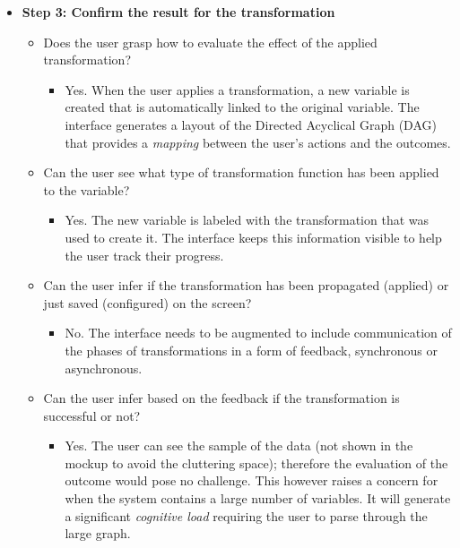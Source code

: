 \documentclass[12pt,letterpaper]{article}
\begin{document}
\begin{itemize}
\begin{itemize}
    \end{itemize}
    \item \textbf{Step 3: Confirm the result for the transformation}
    \begin{itemize}
        \item Does the user grasp how to evaluate the effect of the applied transformation?
        \begin{itemize}
                \item Yes. When the user applies a transformation, a new variable is created that is automatically linked to the original variable. The interface generates a layout of the Directed Acyclical Graph (DAG) that provides a \textit{mapping} between the user's actions and the outcomes.   
        \end{itemize}
        \item Can the user see what type of transformation function has been applied to the variable?
        \begin{itemize}
                \item Yes. The new variable is labeled with the transformation that was used to create it. The interface keeps this information visible to help the user track their progress.
        \end{itemize}
        \item Can the user infer if the transformation has been propagated (applied) or just saved (configured) on the screen?
        \begin{itemize}
                \item No. The interface needs to be augmented to include communication of the phases of transformations in a form of feedback, synchronous or asynchronous. 
        \end{itemize}
        \item Can the user infer based on the feedback if the transformation is successful or not?
        \begin{itemize}
                \item Yes. The user can see the sample of the data (not shown in the mockup to avoid the cluttering space); therefore the evaluation of the outcome would pose no challenge. This however raises a concern for when the system contains a large number of variables. It will generate a significant \textit{cognitive load} requiring the user to parse through the large graph.
        \end{itemize}
    \end{itemize}
\end{itemize}
\end{document}

